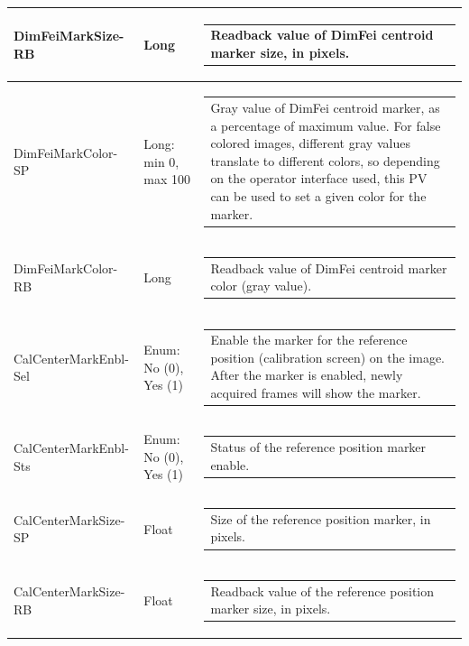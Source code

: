 \documentclass[openany]{article}
\begin{document}
\begin{longtable}{| m{3.0cm} m{4.5cm}  m{7.0cm} |}
        DimFeiMarkSize-RB & Long & \begin{tabular}{@{}m{6cm}@{}}
                Readback value of DimFei centroid marker size, in pixels.
            \end{tabular} \hypertarget{pv:dimfei-mark-color}{}\\ \hline
        DimFeiMarkColor-SP & Long: min 0, max 100 & \begin{tabular}{@{}m{6cm}@{}}
                Gray value of DimFei centroid marker, as a percentage of maximum value. For false colored images,
                different gray values translate to different colors, so depending
                on the operator interface used, this PV can be used to set a given
                color for the marker.
            \end{tabular} \\ \hline
        DimFeiMarkColor-RB & Long & \begin{tabular}{@{}m{6cm}@{}}
                Readback value of DimFei centroid marker color (gray value).
            \end{tabular} \hypertarget{pv:cal-center-mark-enbl}{}\\ \hline
        CalCenterMarkEnbl-Sel & Enum: No (0), Yes (1) & \begin{tabular}{@{}m{6cm}@{}}
                Enable the marker for the reference position (calibration screen)
                on the image. After the marker is enabled, newly acquired frames will
                show the marker.
            \end{tabular} \\ \hline
        CalCenterMarkEnbl-Sts & Enum: No (0), Yes (1) & \begin{tabular}{@{}m{6cm}@{}}
                Status of the reference position marker enable.
            \end{tabular} \hypertarget{pv:cal-center-mark-size}{}\\ \hline
        CalCenterMarkSize-SP & Float & \begin{tabular}{@{}m{6cm}@{}}
                Size of the reference position marker, in pixels.
            \end{tabular} \\ \hline
        CalCenterMarkSize-RB & Float & \begin{tabular}{@{}m{6cm}@{}}
                Readback value of the reference position marker size, in pixels.

\end{tabular}
\end{longtable}
\end{document}
